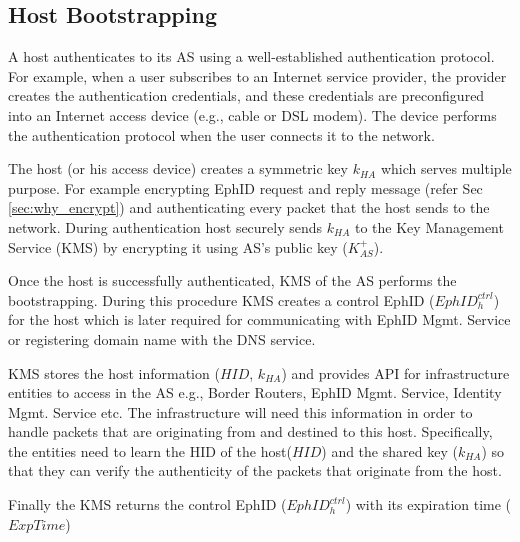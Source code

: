 \subsection{Host Bootstrapping}
A host authenticates to its AS using a well-established authentication protocol. For example, when a user subscribes to an Internet service provider, the provider creates the authentication credentials, and these credentials are preconfigured into an Internet access device (e.g., cable or DSL modem). The device performs the authentication protocol when the user connects it to the network.

The host (or his access device) creates a symmetric key $k_{HA}$ which serves multiple purpose. For example encrypting EphID request and reply message (refer Sec \ref{sec:why_encrypt}) and authenticating every packet that the host sends to the network. During authentication host securely sends $k_{HA}$ to the Key Management Service (KMS) by encrypting it using AS's public key ($K^{+}_{AS}$). 

Once the host is successfully authenticated, KMS of the AS performs the bootstrapping. During this procedure KMS creates a control EphID ($EphID_{h}^{ctrl}$) for the host which is later required for communicating with EphID Mgmt. Service or registering domain name with the DNS service. 

KMS stores the host information ($HID$, $k_{HA}$) and provides API for infrastructure entities to access in the AS e.g., Border Routers, EphID Mgmt. Service, Identity Mgmt. Service etc. The infrastructure will need this information in order to handle packets that are originating from and destined to this host. Specifically, the entities need to learn the HID of the host($HID$) and the shared key ($k_{HA}$) so that they can verify the authenticity of the packets that originate from the host.

Finally the KMS returns the control EphID ($EphID_{h}^{ctrl}$) with its expiration time ($ExpTime$)

